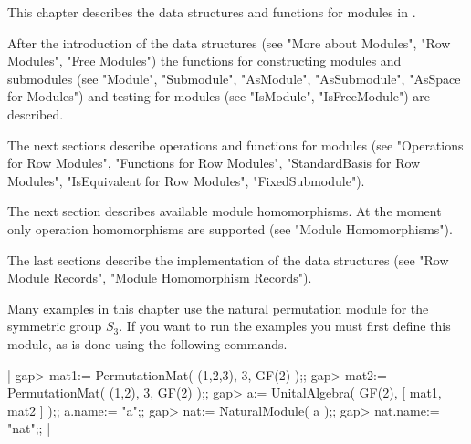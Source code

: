 \def\MeatAxe{\sf MeatAxe}

This chapter describes the data structures and functions for modules in
{\GAP}.

After the introduction of the data structures (see "More about Modules",
"Row Modules", "Free Modules") the functions for constructing modules
and submodules (see "Module", "Submodule", "AsModule", "AsSubmodule",
"AsSpace for Modules") and testing for modules (see "IsModule",
"IsFreeModule") are described.

The next sections describe operations and functions for modules (see
"Operations for Row Modules", "Functions for Row Modules", "StandardBasis
for Row Modules", "IsEquivalent for Row Modules", "FixedSubmodule").

The next section describes available module homomorphisms.  At the moment
only operation homomorphisms are supported (see "Module Homomorphisms").

The last sections describe the implementation of the data structures (see
"Row Module Records", "Module Homomorphism Records").

\vspace{5mm}

Many examples in this chapter use the natural permutation module for
the symmetric group $S_3$.  If you want to run the examples you must first
define this module, as is done using the following commands.

|    gap> mat1:= PermutationMat( (1,2,3), 3, GF(2) );;
    gap> mat2:= PermutationMat(   (1,2), 3, GF(2) );;
    gap> a:= UnitalAlgebra( GF(2), [ mat1, mat2 ] );; a.name:= "a";;
    gap> nat:= NaturalModule( a );;
    gap> nat.name:= "nat";; |

\vspace{5mm}

